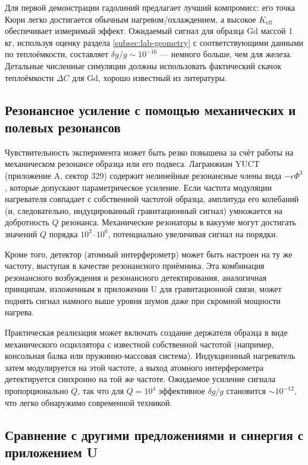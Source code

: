 \documentclass[12pt]{article}
\theoremstyle{remark}
\newcommand{\Keff}{K_{\mathrm{eff}}}
\begin{document}
	Для первой демонстрации гадолиний предлагает лучший компромисс: его точка Кюри легко достигается обычным нагревом/охлаждением, а высокое \(\Keff\) обеспечивает измеримый эффект. Ожидаемый сигнал для образца Gd массой 1 кг, используя оценку раздела \ref{subsec:lab-geometry} с соответствующими данными по теплоёмкости, составляет $\delta g/g \sim 10^{-16}$ — немного больше, чем для железа. Детальные численные симуляции должны использовать фактический скачок теплоёмкости $\Delta C$ для Gd, хорошо известный из литературы.
	
	\subsection{Резонансное усиление с помощью механических и полевых резонансов}
	\label{subsec:resonant-enhancement}
	
	Чувствительность эксперимента может быть резко повышена за счёт работы на механическом резонансе образца или его подвеса. Лагранжиан YUCT (приложение A, сектор 329) содержит нелинейные резонансные члены вида \(-\epsilon \Phi^3\), которые допускают параметрическое усиление. Если частота модуляции нагревателя совпадает с собственной частотой образца, амплитуда его колебаний (и, следовательно, индуцированный гравитационный сигнал) умножается на добротность \(Q\) резонанса. Механические резонаторы в вакууме могут достигать значений \(Q\) порядка \(10^3\)–\(10^6\), потенциально увеличивая сигнал на порядки.
	
	Кроме того, детектор (атомный интерферометр) может быть настроен на ту же частоту, выступая в качестве резонансного приёмника. Эта комбинация резонансного возбуждения и резонансного детектирования, аналогичная принципам, изложенным в приложении U для гравитационной связи, может поднять сигнал намного выше уровня шумов даже при скромной мощности нагрева.
	
	Практическая реализация может включать создание держателя образца в виде механического осциллятора с известной собственной частотой (например, консольная балка или пружинно-массовая система). Индукционный нагреватель затем модулируется на этой частоте, а выход атомного интерферометра детектируется синхронно на той же частоте. Ожидаемое усиление сигнала пропорционально \(Q\), так что для \(Q = 10^4\) эффективное \(\delta g/g\) становится $\sim 10^{-12}$, что легко обнаружимо современной техникой.
	
	\subsection{Сравнение с другими предложениями и синергия с приложением U}
	\label{subsec:comparison-appU}
	
\end{document}
